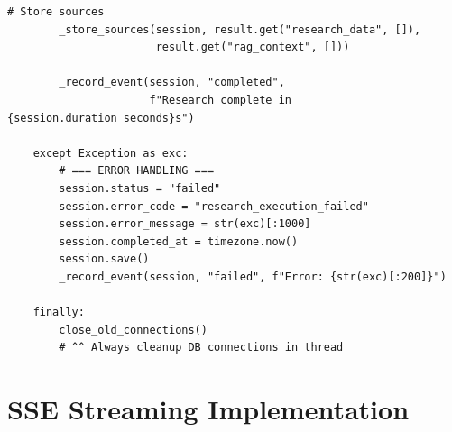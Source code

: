 \documentclass[11pt,a4paper,twoside]{report}
\begin{document}
\begin{lstlisting}[style=pythonstyle,caption={services.py --- Background Job Runner}]
        # Store sources
        _store_sources(session, result.get("research_data", []),
                       result.get("rag_context", []))

        _record_event(session, "completed",
                      f"Research complete in {session.duration_seconds}s")

    except Exception as exc:
        # === ERROR HANDLING ===
        session.status = "failed"
        session.error_code = "research_execution_failed"
        session.error_message = str(exc)[:1000]
        session.completed_at = timezone.now()
        session.save()
        _record_event(session, "failed", f"Error: {str(exc)[:200]}")

    finally:
        close_old_connections()
        # ^^ Always cleanup DB connections in thread
\end{lstlisting}

\section{SSE Streaming Implementation}
\end{document}
